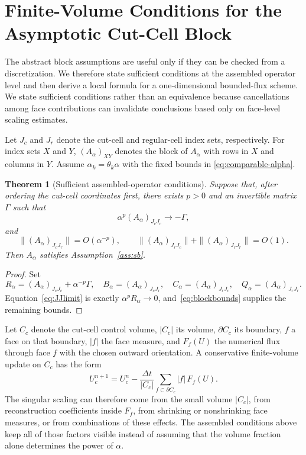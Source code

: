 \documentclass[preprint,12pt]{elsarticle}
\newtheorem{theorem}{Theorem}[section]
\begin{document}
\section{Finite-Volume Conditions for the Asymptotic Cut-Cell Block}
\label{sec:characterization}

The abstract block assumptions are useful only if they can be checked from a
discretization.  We therefore state sufficient conditions at the assembled
operator level and then derive a local formula for a one-dimensional
bounded-flux scheme.  We state sufficient conditions rather than an equivalence because cancellations
among face contributions can invalidate conclusions based only on face-level
scaling estimates.

Let $J_c$ and $J_r$ denote the cut-cell and regular-cell index sets,
respectively.  For index sets $X$ and $Y$, $(A_\alpha)_{XY}$ denotes the block
of $A_\alpha$ with rows in $X$ and columns in $Y$.  Assume $\alpha_k=\theta_k\alpha$ with the fixed
bounds in \eqref{eq:comparable-alpha}.

\begin{theorem}[Sufficient assembled-operator conditions]
\label{thm:characterization}
Suppose that, after ordering the cut-cell coordinates first, there exists
$p>0$ and an invertible matrix $\Gamma$ such that
\begin{equation}
    \alpha^p(A_\alpha)_{J_cJ_c}\longrightarrow-\Gamma,
    \label{eq:JJlimit}
\end{equation}
and
\begin{equation}
    \|(A_\alpha)_{J_cJ_r}\|=O(\alpha^{-p}),
    \qquad
    \|(A_\alpha)_{J_rJ_c}\|+\|(A_\alpha)_{J_rJ_r}\|=O(1).
    \label{eq:blockbounds}
\end{equation}
Then $A_\alpha$ satisfies Assumption~\ref{ass:sb}.
\end{theorem}

\begin{proof}
Set
\[
 R_\alpha=(A_\alpha)_{J_cJ_c}+\alpha^{-p}\Gamma,\quad
 B_\alpha=(A_\alpha)_{J_cJ_r},\quad
 C_\alpha=(A_\alpha)_{J_rJ_c},\quad
 Q_\alpha=(A_\alpha)_{J_rJ_r}.
\]
Equation~\eqref{eq:JJlimit} is exactly
$\alpha^pR_\alpha\to0$, and~\eqref{eq:blockbounds} supplies the remaining
bounds.
\end{proof}

Let $C_c$ denote the cut-cell control volume, $|C_c|$ its volume,
$\partial C_c$ its boundary, $f$ a face on that boundary, $|f|$ the face
measure, and $F_f(U)$ the numerical flux through face $f$ with the chosen
outward orientation.  A conservative finite-volume update on $C_c$ has the form
\begin{equation}
    U_c^{n+1}
    =
    U_c^n
    -
    \frac{\Delta t}{|C_c|}
    \sum_{f\subset\partial C_c}|f|\,F_f(U).
    \label{eq:fv_general}
\end{equation}
The singular scaling can therefore come from the small volume
$|C_c|$, from reconstruction coefficients inside $F_f$, from shrinking or
nonshrinking face measures, or from combinations of these effects.  The
assembled conditions above keep all of those factors visible instead of
assuming that the volume fraction alone determines the power of $\alpha$.
\end{document}

